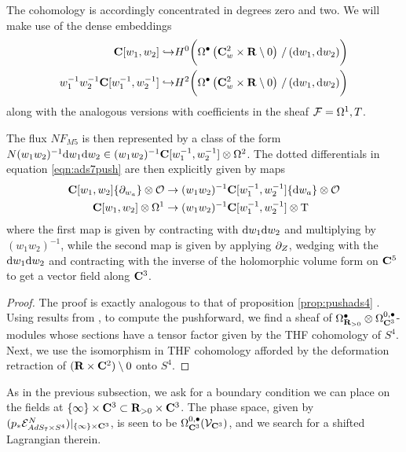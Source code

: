 \documentclass[../main.tex]{subfiles}
\begin{document}
The cohomology is accordingly concentrated in degrees zero and two. We will make use of the dense embeddings
\begin{align*}
\mathbf{C}[w_1,w_2] \hookrightarrow & H^0 \bigg( \Omega^\bullet\left(\mathbf{C}^2_w \times \mathbf{R} \setminus 0 \right) \, / \, (\mathrm{d} w_1, \mathrm{d} w_2) \bigg) \\
w_{1}^{-1} w_2^{-1} \mathbf{C}[w_1^{-1},w_2^{-1}] \hookrightarrow & H^2 \bigg( \Omega^\bullet\left(\mathbf{C}^2_w \times \mathbf{R} \setminus 0 \right) \, / \, (\mathrm{d} w_1, \mathrm{d} w_2) \bigg)
\end{align*}
along with the analogous versions with coefficients in the sheaf $\mathcal{F} = \Omega^1, T$. 

The flux $NF_{M5}$ is then represented by a class of the form $N(w_1w_2)^{-1} \mathrm{d} w_1 \mathrm{d} w_2 \in (w_1w_2)^{-1} \mathbf{C}[w_1^{-1}, w_2^{-1}]\otimes \Omega^2$. The dotted differentials in equation \ref{eqn:ads7push} are then explicitly given by maps 
\begin{align*}
\mathbf{C}[w_1,w_2]\{\partial_{w_a}\} \otimes \mathcal{O} &\to (w_1w_2)^{-1}\mathbf{C}[w_1^{-1}, w_2^{-1}] \{\mathrm{d} w_a\}\otimes \mathcal{O} \\
\mathbf{C} [w_1, w_2] \otimes \Omega^1 &\to (w_1w_2)^{-1}\mathbf{C}[w_1^{-1}, w_2^{-1}] \otimes {\mathrm{T}}  
\end{align*}
where the first map is given by contracting with $\mathrm{d} w_1 \mathrm{d} w_2$ and multiplying by $(w_1w_2)^{-1}$, while the second map is given by applying $\partial_Z$, wedging with the $\mathrm{d} w_1 \mathrm{d} w_2$ and contracting with the inverse of the holomorphic volume form on $\mathbf{C}^5$ to get a vector field along $\mathbf{C}^3$. 

\begin{proof}
The proof is exactly analogous to that of proposition \ref{prop:pushads4} . Using results from \cite[Sec. 4.2]{KormanThesis}, \cite{KamberTondeur}  to compute the pushforward, we find a sheaf of $\Omega^\bullet_{\mathbf{R}_{>0}}\otimes \Omega^{0,\bullet}_{\mathbf{C}^3}$-modules whose sections have a tensor factor given by the THF cohomology of $S^4$. Next, we use the isomorphism in THF cohomology afforded by the deformation retraction of $(\mathbf{R}\times \mathbf{C}^2)\setminus 0$ onto $S^4$. 
\end{proof}

\parsec{}

As in the previous subsection, we ask for a boundary condition we can place on the fields at $\{\infty\}\times \mathbf{C}^3\subset \mathbf{R}_{>0}\times \mathbf{C}^3$. The phase space, given by $(p_* \mathcal{E}^N_{AdS_7\times S^4})|_{\{\infty\} \times \mathbf{C}^3}$, is seen to be $\Omega^{0,\bullet}_{\mathbf{C}^3} (\mathcal{V}_{\mathbf{C}^3} )$, and we search for a shifted Lagrangian therein. 
\end{document}

